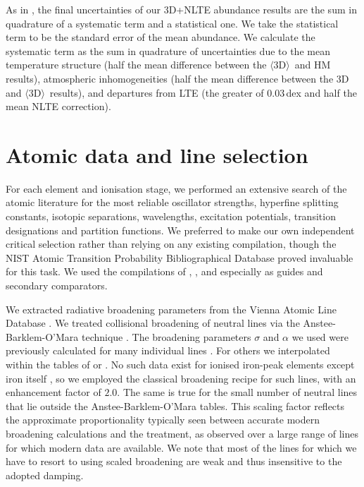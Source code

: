 \documentclass[traditabstract]{aa}
\newcommand{\oneDAV}{$\langle\mathrm{3D}\rangle$}
\begin{document}
As in , the final uncertainties of our 3D+NLTE abundance results are the sum in quadrature of a systematic term and a statistical one.  We take the statistical term to be the standard error of the mean abundance.  We calculate the systematic term as the sum in quadrature of uncertainties due to the mean temperature structure (half the mean difference between the \oneDAV\ and HM results), atmospheric inhomogeneities (half the mean difference between the 3D and \oneDAV\ results), and departures from LTE (the greater of 0.03\,dex and half the mean NLTE correction).  

\section{Atomic data and line selection}
\label{atomicdata}

For each element and ionisation stage, we performed an extensive search of the atomic literature for the most
reliable oscillator strengths, hyperfine splitting constants, isotopic separations, wavelengths, excitation potentials, 
transition designations and partition functions. We preferred to make our own independent critical selection rather than relying on any existing 
compilation, though the NIST Atomic Transition Probability Bibliographical Database \citep{NISTbib} proved invaluable 
for this task.  We used the compilations of \citet{Martin88}, \citet{Fuhr88}, \citet{Doidge95} and especially 
\citet{Morton03} as guides and secondary comparators.

We extracted radiative broadening parameters from the Vienna Atomic Line Database \citep[VALD, ][]{VALD}.  We treated
collisional broadening of neutral lines via the Anstee-Barklem-O'Mara technique \citep{Anstee95, Barklem97, Barklem98}.
The broadening parameters $\sigma$ and $\alpha$ we used were previously calculated for many individual lines \citep{Barklem00}.  For others we interpolated within the tables of
\cite{Anstee95} or \cite{Barklem97}.  No such data exist for ionised iron-peak elements except iron itself \citep{2005A&A...435..373B}, so we employed
the classical \citet{Unsold} broadening recipe for such lines, with an enhancement factor of $2.0$.  The same is true for the small number of neutral lines that lie outside the Anstee-Barklem-O'Mara tables.  This scaling factor reflects the approximate proportionality typically seen between accurate modern broadening calculations and the \citet{Unsold} treatment, as observed over a large range of lines for which modern data are available. We note that most of the lines for which we have to resort to using scaled  \citet{Unsold} broadening are weak and thus insensitive to the adopted damping.
\end{document}
